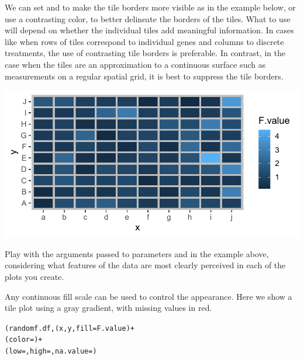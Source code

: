 \documentclass[krantz2]{krantz}\usepackage{knitr}
\begin{document}
We can set  and  to make the tile borders more visible as in the example below, or use a contrasting color, to better delineate the borders of the tiles. What to use will depend on whether the individual tiles add meaningful information. In cases like when rows of tiles correspond to individual genes and columns to discrete treatments, the use of contrasting tile borders is preferable. In contrast, in the case when the tiles are an approximation to a continuous surface such as measurements on a regular spatial grid, it is best to suppress the tile borders.

\begin{knitrout}\footnotesize
{}\color{fgcolor}\begin{kframe}
\begin{alltt}
    \hlopt{+}
  \hlstd{(} \hlstd{=} \hlstd{,}  \hlstd{=} \hlstd{)}
\end{alltt}
\end{kframe}

{\centering \includegraphics[width=.7\textwidth]{figure/pos-tile-plot-03-1}

}



\end{knitrout}

\begin{playground}
Play with the arguments passed to parameters  and  in the example above, considering what features of the data are most clearly perceived in each of the plots you create.
\end{playground}

Any continuous fill scale can be used to control the appearance. Here we show a tile plot using a gray gradient, with missing values in red.

\begin{knitrout}\footnotesize
{}\color{fgcolor}\begin{kframe}
\begin{alltt}
(randomf.df, (x, y, fill = F.value) +
  (color = ) +
  (low = , high = , na.value = )
\end{alltt}
\end{kframe}
\end{knitrout}
\end{document}
